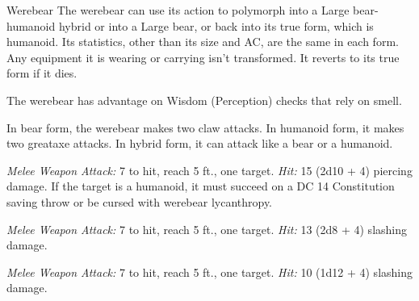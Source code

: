 \documentclass[10pt,a4paper,twoside,bg=print,twocolumn,openany,nodeprecatedcode]{dndbook}
\begin{document}
\begin{DndMonster}[float=t]{Werebear}
\DndMonsterBasics[
armor-class = {10 in humanoid form (11 (natural armor) in bear or hybrid form)},
hit-points = {\DndDice{18d8 + 54}},
speed = {30 ft. (40 ft., climb 30 ft. in bear or hybrid form)}
]
\DndMonsterAbilityScores[
 str = 19,
 dex = 10,
 con = 17,
 int = 11,
 wis = 12,
 cha = 12
]
\DndMonsterDetails[
skills = {Perception +7},
damage-immunities = {bludgeoning, piercing, slashing from nonmagical attacks that aren't silvered},
languages = {Common (can't speak in bear form)},
challenge = 5,
]
The werebear can use its action to polymorph into a Large bear-humanoid hybrid or into a Large bear, or back into its true form, which is humanoid. Its statistics, other than its size and AC, are the same in each form. Any equipment it is wearing or carrying isn't transformed. It reverts to its true form if it dies.

The werebear has advantage on Wisdom (Perception) checks that rely on smell.

In bear form, the werebear makes two claw attacks. In humanoid form, it makes two greataxe attacks. In hybrid form, it can attack like a bear or a humanoid.

\textsl{Melee Weapon Attack:} 7 to hit, reach 5 ft., one target. \textsl{Hit:} 15 (2d10 + 4) piercing damage. If the target is a humanoid, it must succeed on a DC 14 Constitution saving throw or be cursed with werebear lycanthropy.

\textsl{Melee Weapon Attack:} 7 to hit, reach 5 ft., one target. \textsl{Hit:} 13 (2d8 + 4) slashing damage.

\textsl{Melee Weapon Attack:} 7 to hit, reach 5 ft., one target. \textsl{Hit:} 10 (1d12 + 4) slashing damage.

\end{DndMonster}
\end{document}
